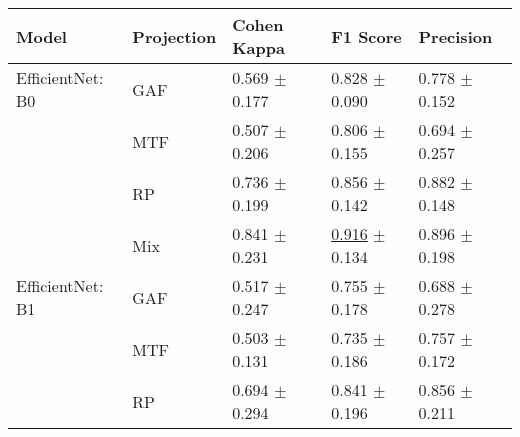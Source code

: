 
\begin{tabular}{lllll}
\toprule
Model & Projection & Cohen Kappa & F1 Score & Precision \\
\midrule
EfficientNet: B0 & GAF & \textcolor[rgb]{0.6962025316,0.3037974684,0}{0.569} $\pm$ \textcolor[rgb]{0.3400275211,0.5000000000,0}{0.177} & \textcolor[rgb]{0.4231517510,0.5000000000,0}{0.828} $\pm$ \textcolor[rgb]{0.0544433560,0.5000000000,0}{0.090} & \textcolor[rgb]{0.3865030675,0.5000000000,0}{0.778} $\pm$ \textcolor[rgb]{0.0609210007,0.5000000000,0}{0.152} \\
 & MTF & \textcolor[rgb]{0.8386075949,0.1613924051,0}{0.507} $\pm$ \textcolor[rgb]{0.5010483176,0.4989516824,0}{0.206} & \textcolor[rgb]{0.5030067209,0.4969932791,0}{0.806} $\pm$ \textcolor[rgb]{0.4981776657,0.5000000000,0}{0.155} & \textcolor[rgb]{0.6073619632,0.3926380368,0}{0.694} $\pm$ \textcolor[rgb]{0.5747695565,0.4252304435,0}{0.257} \\
 & RP & \textcolor[rgb]{0.3158803222,0.5000000000,0}{0.736} $\pm$ \textcolor[rgb]{0.4632782795,0.5000000000,0}{0.199} & \textcolor[rgb]{0.3195525292,0.5000000000,0}{0.856} $\pm$ \textcolor[rgb]{0.4103539755,0.5000000000,0}{0.142} & \textcolor[rgb]{0.1104294479,0.5000000000,0}{0.882} $\pm$ \textcolor[rgb]{0.0429202964,0.5000000000,0}{0.148} \\
 & Mix & \textcolor[rgb]{0.0776754891,0.5000000000,0}{0.841} $\pm$ \textcolor[rgb]{0.6456888129,0.3543111871,0}{0.231} & \underline{\textcolor[rgb]{0.0992217899,0.5000000000,0}{0.916}} $\pm$ \textcolor[rgb]{0.3552176022,0.5000000000,0}{0.134} & \textcolor[rgb]{0.0736196319,0.5000000000,0}{0.896} $\pm$ \textcolor[rgb]{0.2866946969,0.5000000000,0}{0.198} \\
EfficientNet: B1 & GAF & \textcolor[rgb]{0.8164556962,0.1835443038,0}{0.517} $\pm$ \textcolor[rgb]{0.7344714342,0.2655285658,0}{0.247} & \textcolor[rgb]{0.6908383445,0.3091616555,0}{0.755} $\pm$ \textcolor[rgb]{0.6544468040,0.3455531960,0}{0.178} & \textcolor[rgb]{0.6257668712,0.3742331288,0}{0.688} $\pm$ \textcolor[rgb]{0.6764224307,0.3235775693,0}{0.278} \\
 & MTF & \textcolor[rgb]{0.8475258918,0.1524741082,0}{0.503} $\pm$ \textcolor[rgb]{0.0816749972,0.5000000000,0}{0.131} & \textcolor[rgb]{0.7645914397,0.2354085603,0}{0.735} $\pm$ \textcolor[rgb]{0.7107928934,0.2892071066,0}{0.186} & \textcolor[rgb]{0.4417177914,0.5000000000,0}{0.757} $\pm$ \textcolor[rgb]{0.1586694821,0.5000000000,0}{0.172} \\
 & RP & \textcolor[rgb]{0.4113924051,0.5000000000,0}{0.694} $\pm$ \textcolor[rgb]{1.0000000000,0.0000000000,0}{0.294} & \textcolor[rgb]{0.3756632473,0.5000000000,0}{0.841} $\pm$ \textcolor[rgb]{0.7777535685,0.2222464315,0}{0.196} & \textcolor[rgb]{0.1790295594,0.5000000000,0}{0.856} $\pm$ \textcolor[rgb]{0.3497679786,0.5000000000,0}{0.211} \\

\end{tabular}
